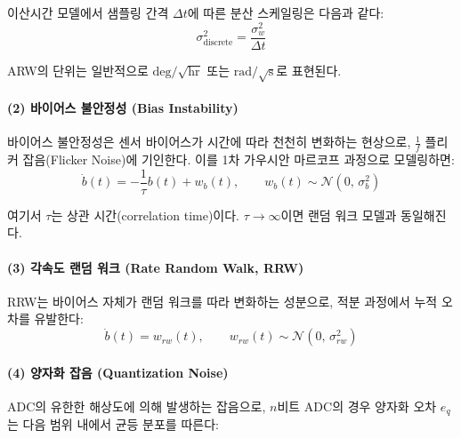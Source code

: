                 이산시간 모델에서 샘플링 간격 $\Delta t$에 따른 분산 스케일링은 다음과 같다:\\

                \begin{equation}
                    \sigma_{\text{discrete}}^2 = \frac{\sigma_w^2}{\Delta t}
                    \label{eq:white_noise_discrete}
                \end{equation}

                ARW의 단위는 일반적으로 $\text{deg}/\sqrt{\text{hr}}$ 또는 $\text{rad}/\sqrt{\text{s}}$로 표현된다.\\

            \paragraph{(2) 바이어스 불안정성 (Bias Instability)}
                바이어스 불안정성은 센서 바이어스가 시간에 따라 천천히 변화하는 현상으로, $\frac{1}{f}$ 플리커 잡음(Flicker Noise)에 기인한다. 이를 1차 가우시안 마르코프 과정으로 모델링하면:\\

                \begin{equation}
                    \dot{b}(t) = -\frac{1}{\tau} b(t) + w_b(t), \qquad w_b(t) \sim \mathcal{N}(0,\, \sigma_b^2)
                    \label{eq:bias_instability}
                \end{equation}

                \noindent 여기서 $\tau$는 상관 시간(correlation time)이다. $\tau \to \infty$이면 랜덤 워크 모델과 동일해진다.\\

            \paragraph{(3) 각속도 랜덤 워크 (Rate Random Walk, RRW)}
                RRW는 바이어스 자체가 랜덤 워크를 따라 변화하는 성분으로, 적분 과정에서 누적 오차를 유발한다:\\

                \begin{equation}
                    \dot{b}(t) = w_{rw}(t), \qquad w_{rw}(t) \sim \mathcal{N}(0,\, \sigma_{rw}^2)
                    \label{eq:rrw}
                \end{equation}

            \paragraph{(4) 양자화 잡음 (Quantization Noise)}
                ADC의 유한한 해상도에 의해 발생하는 잡음으로, $n$비트 ADC의 경우 양자화 오차 $e_q$는 다음 범위 내에서 균등 분포를 따른다:\\

